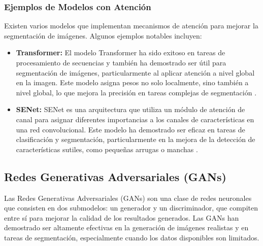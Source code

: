 \subsubsection{Ejemplos de Modelos con Atención}  
Existen varios modelos que implementan mecanismos de atención para mejorar la segmentación de imágenes. Algunos ejemplos notables incluyen:
\begin{itemize}
    \item \textbf{Transformer:} El modelo Transformer ha sido exitoso en tareas de procesamiento de secuencias y también ha demostrado ser útil para segmentación de imágenes, particularmente al aplicar atención a nivel global en la imagen. Este modelo asigna pesos no solo localmente, sino también a nivel global, lo que mejora la precisión en tareas complejas de segmentación \cite{autor2022transformer}.
    \item \textbf{SENet:} SENet es una arquitectura que utiliza un módulo de atención de canal para asignar diferentes importancias a los canales de características en una red convolucional. Este modelo ha demostrado ser eficaz en tareas de clasificación y segmentación, particularmente en la mejora de la detección de características sutiles, como pequeñas arrugas o manchas \cite{autor2022senet}.
\end{itemize}

\subsection{Redes Generativas Adversariales (GANs)}  
Las Redes Generativas Adversariales (GANs) son una clase de redes neuronales que consisten en dos submodelos: un generador y un discriminador, que compiten entre sí para mejorar la calidad de los resultados generados. Las GANs han demostrado ser altamente efectivas en la generación de imágenes realistas y en tareas de segmentación, especialmente cuando los datos disponibles son limitados.

